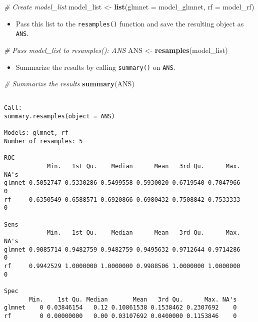 \documentclass[]{book}
\newenvironment{Shaded}{\begin{snugshade}}{\end{snugshade}}
\newcommand{\KeywordTok}[1]{\textcolor[rgb]{0.13,0.29,0.53}{\textbf{#1}}}
\newcommand{\DataTypeTok}[1]{\textcolor[rgb]{0.13,0.29,0.53}{#1}}
\newcommand{\StringTok}[1]{\textcolor[rgb]{0.31,0.60,0.02}{#1}}
\newcommand{\CommentTok}[1]{\textcolor[rgb]{0.56,0.35,0.01}{\textit{#1}}}
\newcommand{\NormalTok}[1]{#1}
\providecommand{\tightlist}{%
  \setlength{\itemsep}{0pt}\setlength{\parskip}{0pt}}
\begin{document}
\begin{Shaded}
\begin{Highlighting}[]
\CommentTok{# Create model_list}
\NormalTok{model_list <-}\StringTok{ }\KeywordTok{list}\NormalTok{(}\DataTypeTok{glmnet =}\NormalTok{ model_glmnet, }\DataTypeTok{rf =}\NormalTok{ model_rf)}
\end{Highlighting}
\end{Shaded}

\begin{itemize}
\tightlist
\item
  Pass this list to the \texttt{resamples()} function and save the
  resulting object as \texttt{ANS}.
\end{itemize}

\begin{Shaded}
\begin{Highlighting}[]
\CommentTok{# Pass model_list to resamples(): ANS}
\NormalTok{ANS <-}\StringTok{ }\KeywordTok{resamples}\NormalTok{(model_list)}
\end{Highlighting}
\end{Shaded}

\begin{itemize}
\tightlist
\item
  Summarize the results by calling \texttt{summary()} on \texttt{ANS}.
\end{itemize}

\begin{Shaded}
\begin{Highlighting}[]
\CommentTok{# Summarize the results}
\KeywordTok{summary}\NormalTok{(ANS)}
\end{Highlighting}
\end{Shaded}

\begin{verbatim}

Call:
summary.resamples(object = ANS)

Models: glmnet, rf 
Number of resamples: 5 

ROC 
            Min.   1st Qu.    Median      Mean   3rd Qu.      Max. NA's
glmnet 0.5052747 0.5330286 0.5499558 0.5930020 0.6719540 0.7047966    0
rf     0.6350549 0.6588571 0.6920866 0.6980432 0.7508842 0.7533333    0

Sens 
            Min.   1st Qu.    Median      Mean   3rd Qu.      Max. NA's
glmnet 0.9085714 0.9482759 0.9482759 0.9495632 0.9712644 0.9714286    0
rf     0.9942529 1.0000000 1.0000000 0.9988506 1.0000000 1.0000000    0

Spec 
       Min.    1st Qu. Median       Mean   3rd Qu.      Max. NA's
glmnet    0 0.03846154   0.12 0.10861538 0.1538462 0.2307692    0
rf        0 0.00000000   0.00 0.03107692 0.0400000 0.1153846    0
\end{verbatim}
\end{document}
